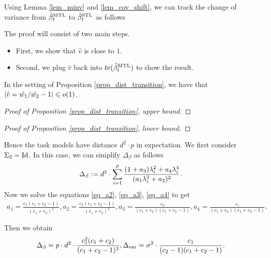 Using Lemma \ref{lem_minv} and \ref{lem_cov_shift}, we can track the change of variance from $\hat{\beta}_t^{\text{MTL}}$ to $\hat{\beta}_t^{\text{STL}}$ as follows


The proof will consist of two main steps.
\begin{itemize}
	\item First, we show that $\hat{v}$ is close to $1$.
	\item Second, we plug $\hat{v}$ back into $te(\hat{\beta}_t^{\text{MTL}})$ to show the result.
\end{itemize}

\begin{lemma}
	In the setting of Proposition \ref{prop_dist_transition}, we have that $\left\lvert\hat{v} = \hat{w_1} / \hat{w_2} - 1\right\rvert \leqslant o(1)$.
\end{lemma}

\begin{proof}[Proof of Proposition \ref{prop_dist_transition}, upper bound]
\end{proof}

\begin{proof}[Proof of Proposition \ref{prop_dist_transition}, lower bound]
\end{proof}

Hence the task models have distance $d^2\cdot p$ in expectation.
	We first consider $\Sigma_2 = \operatorname{Id}$. In this case, we can simplify $\Delta_{\beta}$ as follows
	\begin{align} \label{eq_delta_simple}
		\Delta_{\beta} := d^2 \cdot \sum_{i=1}^p \frac{(1 + a_3)\lambda_i^2 + a_4 \lambda_i^4}{(a_1 \lambda_i^2 + a_2)^2}.
	\end{align}
	Now we solve the equations \eqref{eq_a2}, \eqref{eq_a3}, \eqref{eq_a4} to get
	\begin{align}
		a_1 = \frac{c_1(c_1 + c_2 - 1)}{(c_1 + c_2)^2},
		a_2 = \frac{c_2(c_1 + c_2 - 1)}{(c_1 + c_2)^2},
		a_3 = \frac{c_2}{(c_1 + c_2)(c_1 + c_2 - 1)},
		a_4 = \frac{c_1}{(c_1 + c_2)(c_1 + c_2 - 1)}.
	\end{align}

	Then we obtain
	\begin{align}
		\Delta_{\beta} = p \cdot d^2 \cdot \frac{c_1^2 (c_1 + c_2)}{(c_1 + c_2 - 1)^3},
		\Delta_{\text{var}} = \sigma^2 \cdot \frac{c_1}{(c_2 - 1)(c_1 + c_2 - 1)}.
	\end{align}
	
